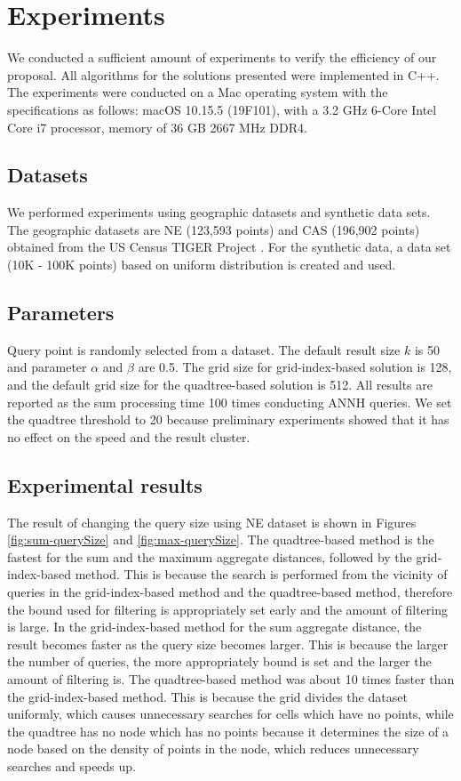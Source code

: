 \documentclass[a4paper,11pt]{report}
\theoremstyle{mytheoremstyle}
\begin{document}
\chapter{Experiments}
\label{section:experiments}

We conducted a sufficient amount of experiments to verify the efficiency of our proposal. All algorithms for the solutions presented were implemented in C++. The experiments were conducted on a Mac operating system with the specifications as follows: macOS 10.15.5 (19F101), with a 3.2 GHz 6-Core Intel Core i7 processor, memory of 36 GB 2667 MHz DDR4.

\section{Datasets}
We performed experiments using geographic datasets and synthetic data sets. The geographic datasets are NE (123,593 points) and CAS (196,902 points) obtained from the US Census TIGER Project \cite{chorochronos}. For the synthetic data, a data set (10K - 100K points) based on uniform distribution is created and used.

\section{Parameters}
Query point is randomly selected from a dataset. The default result size $k$ is 50 and parameter $\alpha$ and $\beta$ are 0.5. The grid size for grid-index-based solution is 128, and the default grid size for the quadtree-based solution is 512. All results are reported as the sum processing time 100 times conducting ANNH queries. We set the quadtree threshold to 20 because preliminary experiments showed that it has no effect on the speed and the result cluster.

\section{Experimental results}

The result of changing the query size using NE dataset is shown in Figures \ref{fig:sum-querySize} and  \ref{fig:max-querySize}. The quadtree-based method is the fastest for the sum and the maximum aggregate distances, followed by the grid-index-based method. This is because the search is performed from the vicinity of queries in the grid-index-based method and the quadtree-based method, therefore the bound used for filtering is appropriately set early and the amount of filtering is large. In the grid-index-based method for the sum aggregate distance, the result becomes faster as the query size becomes larger. This is because the larger the number of queries, the more appropriately bound is set and the larger the amount of filtering is.
The quadtree-based method was about 10 times faster than the grid-index-based method. This is because the grid divides the dataset uniformly, which causes unnecessary searches for cells which have no points, while the quadtree has no node which has no points because it determines the size of a node based on the density of points in the node, which reduces unnecessary searches and speeds up.
\end{document}
